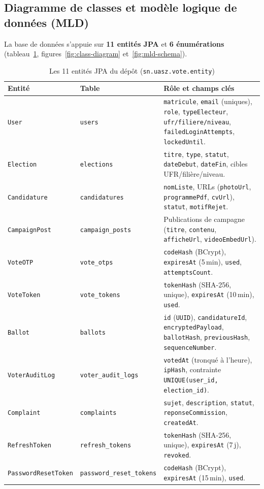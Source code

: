 \subsection{Diagramme de classes et modèle logique de données (MLD)}
La base de données s'appuie sur \textbf{11 entités JPA} et \textbf{6 énumérations} (tableau~\ref{tab:entities}, figures~\ref{fig:class-diagram} et~\ref{fig:mld-schema}).

\begin{table}[H]
\centering
\caption{Les 11 entités JPA du dépôt (\texttt{sn.uasz.vote.entity})}
\label{tab:entities}
\small
\begin{tabularx}{\textwidth}{@{}llX@{}}
\toprule
\rowcolor{uaszlight}
\textbf{Entité} & \textbf{Table} & \textbf{Rôle et champs clés} \\
\midrule
\texttt{User} & \texttt{users} & \texttt{matricule}, \texttt{email} (uniques), \texttt{role}, \texttt{typeElecteur}, \texttt{ufr/filiere/niveau}, \texttt{failedLoginAttempts}, \texttt{lockedUntil}. \\
\texttt{Election} & \texttt{elections} & \texttt{titre}, \texttt{type}, \texttt{statut}, \texttt{dateDebut}, \texttt{dateFin}, cibles UFR/filière/niveau. \\
\texttt{Candidature} & \texttt{candidatures} & \texttt{nomListe}, URLs (\texttt{photoUrl}, \texttt{programmePdf}, \texttt{cvUrl}), \texttt{statut}, \texttt{motifRejet}. \\
\texttt{CampaignPost} & \texttt{campaign\_posts} & Publications de campagne (\texttt{titre}, \texttt{contenu}, \texttt{afficheUrl}, \texttt{videoEmbedUrl}). \\
\texttt{VoteOTP} & \texttt{vote\_otps} & \texttt{codeHash} (BCrypt), \texttt{expiresAt} (5\,min), \texttt{used}, \texttt{attemptsCount}. \\
\texttt{VoteToken} & \texttt{vote\_tokens} & \texttt{tokenHash} (SHA-256, unique), \texttt{expiresAt} (10\,min), \texttt{used}. \\
\texttt{Ballot} & \texttt{ballots} & \texttt{id} (\texttt{UUID}), \texttt{candidatureId}, \texttt{encryptedPayload}, \texttt{ballotHash}, \texttt{previousHash}, \texttt{sequenceNumber}. \\
\texttt{VoterAuditLog} & \texttt{voter\_audit\_logs} & \texttt{votedAt} (tronqué à l'heure), \texttt{ipHash}, contrainte \texttt{UNIQUE(user\_id, election\_id)}. \\
\texttt{Complaint} & \texttt{complaints} & \texttt{sujet}, \texttt{description}, \texttt{statut}, \texttt{reponseCommission}, \texttt{createdAt}. \\
\texttt{RefreshToken} & \texttt{refresh\_tokens} & \texttt{tokenHash} (SHA-256, unique), \texttt{expiresAt} (7\,j), \texttt{revoked}. \\
\texttt{PasswordResetToken} & \texttt{password\_reset\_tokens} & \texttt{codeHash} (BCrypt), \texttt{expiresAt} (15\,min), \texttt{used}. \\
\bottomrule
\end{tabularx}
\end{table}


